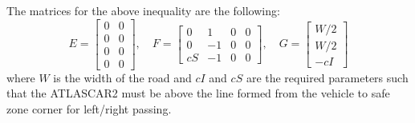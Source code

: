 \documentclass[conference, 11pt]{IEEEtran}
\begin{document}
The matrices for the above inequality are the following:
\[
E= 
\begin{bmatrix}
0&0\\
0&0\\
0&0\\
0&0
\end{bmatrix},
\quad
F=\begin{bmatrix}
0&1&0&0\\
0&-1&0&0\\
cS&-1&0&0
\end{bmatrix},\quad
G=
\begin{bmatrix}
W/2\\W/2\\-cI
\end{bmatrix}
\]
where $W$ is the width of the road and $cI$ and $cS$ are the required parameters such that the ATLASCAR2 must be above the line formed from the vehicle to safe zone corner for left/right passing.
\end{document}
